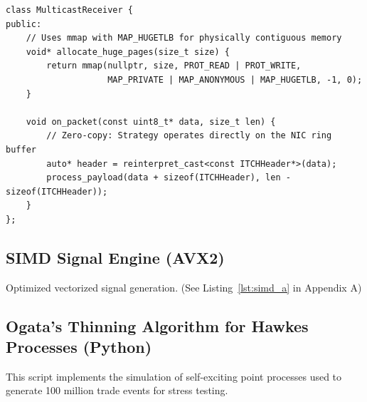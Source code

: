 \begin{lstlisting}[style=cppstyle, caption={Zero-copy buffer management}, label={lst:cpp_receiver}]
class MulticastReceiver {
public:
    // Uses mmap with MAP_HUGETLB for physically contiguous memory
    void* allocate_huge_pages(size_t size) {
        return mmap(nullptr, size, PROT_READ | PROT_WRITE, 
                    MAP_PRIVATE | MAP_ANONYMOUS | MAP_HUGETLB, -1, 0);
    }

    void on_packet(const uint8_t* data, size_t len) {
        // Zero-copy: Strategy operates directly on the NIC ring buffer
        auto* header = reinterpret_cast<const ITCHHeader*>(data);
        process_payload(data + sizeof(ITCHHeader), len - sizeof(ITCHHeader));
    }
};
\end{lstlisting}

\subsection{SIMD Signal Engine (AVX2)}
Optimized vectorized signal generation.
(See Listing~\ref{lst:simd_a} in Appendix A)

\subsection{Ogata's Thinning Algorithm for Hawkes Processes (Python)}
This script implements the simulation of self-exciting point processes used to generate 100 million trade events for stress testing.

